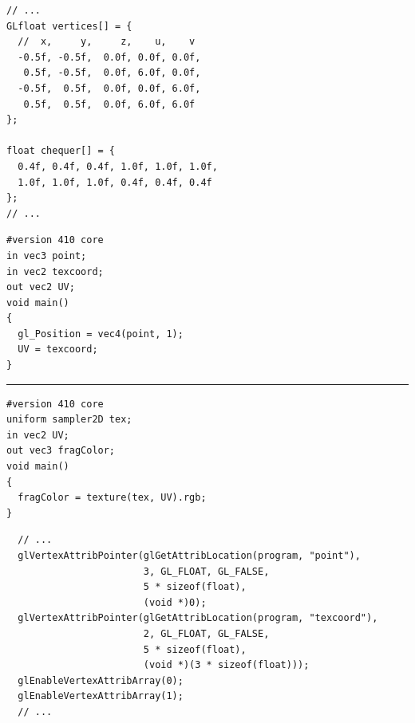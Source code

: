 \documentclass[calcdimensions,landscape,letterpaper]{powersem}
\newcommand{\thecurrentheading}{}
\newcommand{\heading}[1]{\renewcommand{\thecurrentheading}{#1}}
\begin{document}
\begin{slide}
    \heading{Textures: Coordinates and Pixels}
    \begin{center}
        \begin{minipage}[c]{.7\textwidth}
            \begin{verbatim}
// ...
GLfloat vertices[] = {
  //  x,     y,     z,    u,    v
  -0.5f, -0.5f,  0.0f, 0.0f, 0.0f,
   0.5f, -0.5f,  0.0f, 6.0f, 0.0f,
  -0.5f,  0.5f,  0.0f, 0.0f, 6.0f,
   0.5f,  0.5f,  0.0f, 6.0f, 6.0f
};

float chequer[] = {
  0.4f, 0.4f, 0.4f, 1.0f, 1.0f, 1.0f,
  1.0f, 1.0f, 1.0f, 0.4f, 0.4f, 0.4f
};
// ...
            \end{verbatim}
        \end{minipage}
    \end{center}
\end{slide}

\begin{slide}
    \heading{Textures: Shaders}
    \begin{center}
        \begin{minipage}[c]{.5\textwidth}
            \begin{verbatim}
#version 410 core
in vec3 point;
in vec2 texcoord;
out vec2 UV;
void main()
{
  gl_Position = vec4(point, 1);
  UV = texcoord;
}
            \end{verbatim}
            \vspace{-10pt}
            \rule{4cm}{0.4pt}
            \begin{verbatim}
#version 410 core
uniform sampler2D tex;
in vec2 UV;
out vec3 fragColor;
void main()
{
  fragColor = texture(tex, UV).rgb;
}
            \end{verbatim}
        \end{minipage}
    \end{center}
\end{slide}

\begin{slide}
    \heading{Textures: Multiple Vertex Attributes}
    \begin{center}
        \begin{minipage}[c]{.95\textwidth}
            \begin{verbatim}
  // ...
  glVertexAttribPointer(glGetAttribLocation(program, "point"),
                        3, GL_FLOAT, GL_FALSE,
                        5 * sizeof(float),
                        (void *)0);
  glVertexAttribPointer(glGetAttribLocation(program, "texcoord"),
                        2, GL_FLOAT, GL_FALSE,
                        5 * sizeof(float),
                        (void *)(3 * sizeof(float)));
  glEnableVertexAttribArray(0);
  glEnableVertexAttribArray(1);
  // ...
            \end{verbatim}
        \end{minipage}
    \end{center}
\end{slide}
\end{document}
